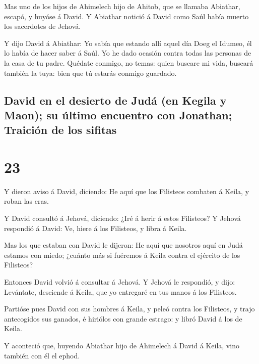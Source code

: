  Mas uno de los hijos de Ahimelech hijo de Ahitob, que se
llamaba Abiathar, escapó, y huyóse á David.  Y Abiathar
notició á David como Saúl había muerto los sacerdotes de Jehová.

 Y dijo David á Abiathar: Yo sabía que estando allí aquel
día Doeg el Idumeo, él lo había de hacer saber á Saúl. Yo he dado
ocasión contra todas las personas de la casa de tu padre.
 Quédate conmigo, no temas: quien buscare mi vida,
buscará también la tuya: bien que tú estarás conmigo guardado.

\hypertarget{david-en-el-desierto-de-juduxe1-en-kegila-y-maon-su-uxfaltimo-encuentro-con-jonathan-traiciuxf3n-de-los-sifitas}{%
\subsection{David en el desierto de Judá (en Kegila y Maon); su último
encuentro con Jonathan; Traición de los
sifitas}\label{david-en-el-desierto-de-juduxe1-en-kegila-y-maon-su-uxfaltimo-encuentro-con-jonathan-traiciuxf3n-de-los-sifitas}}

\hypertarget{section-22}{%
\section{23}\label{section-22}}

 Y dieron aviso á David, diciendo: He aquí que los
Filisteos combaten á Keila, y roban las eras.

 Y David consultó á Jehová, diciendo: ¿Iré á herir á estos
Filisteos? Y Jehová respondió á David: Ve, hiere á los Filisteos, y
libra á Keila.

 Mas los que estaban con David le dijeron: He aquí que
nosotros aquí en Judá estamos con miedo; ¿cuánto más si fuéremos á Keila
contra el ejército de los Filisteos?

 Entonces David volvió á consultar á Jehová. Y Jehová le
respondió, y dijo: Levántate, desciende á Keila, que yo entregaré en tus
manos á los Filisteos.

 Partióse pues David con sus hombres á Keila, y peleó
contra los Filisteos, y trajo antecogidos sus ganados, é hiriólos con
grande estrago: y libró David á los de Keila.

 Y aconteció que, huyendo Abiathar hijo de Ahimelech á
David á Keila, vino también con él el ephod.

